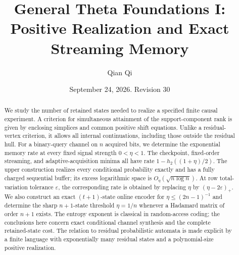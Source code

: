 \documentclass[11pt]{amsart}
\title[Positive realization and streaming memory]{General Theta Foundations I:\\Positive Realization and Exact Streaming Memory}
\author{Qian Qi}
\date{September 24, 2026. Revision 30}
\theoremstyle{definition}\newtheorem{definition}[theorem]{Definition}
\theoremstyle{remark}\newtheorem{remark}[theorem]{Remark}
\newcommand{\1}{\mathbf1}
\begin{document}
\begin{abstract}
We study the number of retained states needed to realize a specified
finite causal experiment. A criterion for simultaneous attainment of the
support-component rank is given by enclosing simplices and common positive
shift equations. Unlike a residual-vertex criterion, it allows all internal
continuations, including those outside the residual hull. For a binary-query
channel on $n$ acquired bits, we determine the exponential memory rate at
every fixed signal strength $0<\eta<1$. The checkpoint, fixed-order streaming,
and adaptive-acquisition minima all have rate
$1-h_2((1+\eta)/2)$. The upper construction realizes every conditional
probability exactly and has a fully charged sequential buffer; its excess
logarithmic space is $O_\eta(\sqrt{n\log n})$. At row total-variation tolerance
$\varepsilon$, the corresponding rate is obtained by replacing $\eta$ by
$(\eta-2\varepsilon)_+$. We also construct an exact $(t+1)$-state online
encoder for $\eta\le(2n-1)^{-1}$ and determine the sharp $n+1$-state threshold
$\eta=1/n$ whenever a Hadamard matrix of order $n+1$ exists. The entropy
exponent is classical in random-access coding; the conclusions here concern
exact conditional channel synthesis and the complete retained-state cost.
The relation to residual probabilistic automata is made explicit by a finite
language with exponentially many residual states and a polynomial-size
positive realization.
\end{abstract}
\maketitle








\end{document}
